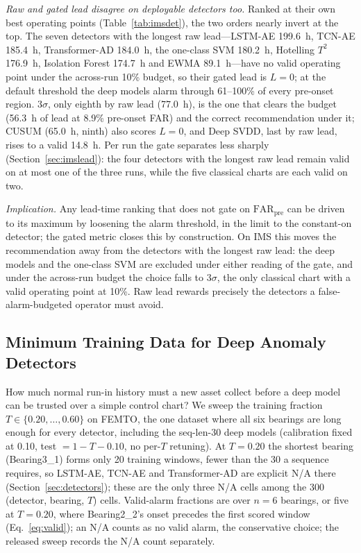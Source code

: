 \documentclass[IJPHM, 2026, 0]{PHMSociety}
\begin{document}
\emph{Raw and gated lead disagree on deployable detectors too.} Ranked at their own best operating points (Table~\ref{tab:imsdet}), the two orders nearly invert at the top. The seven detectors with the longest raw lead---LSTM-AE 199.6~h, TCN-AE 185.4~h, Transformer-AD 184.0~h, the one-class SVM 180.2~h, Hotelling $T^2$ 176.9~h, Isolation Forest 174.7~h and EWMA 89.1~h---have no valid operating point under the across-run 10\% budget, so their gated lead is $L=0$; at the default threshold the deep models alarm through 61--100\% of every pre-onset region. $3\sigma$, only eighth by raw lead (77.0~h), is the one that clears the budget (56.3~h of lead at 8.9\% pre-onset FAR) and the correct recommendation under it; CUSUM (65.0~h, ninth) also scores $L=0$, and Deep SVDD, last by raw lead, rises to a valid 14.8~h. Per run the gate separates less sharply (Section~\ref{sec:imslead}): the four detectors with the longest raw lead remain valid on at most one of the three runs, while the five classical charts are each valid on two.

\emph{Implication.} Any lead-time ranking that does not gate on $\text{FAR}_{\text{pre}}$ can be driven to its maximum by loosening the alarm threshold, in the limit to the constant-on detector; the gated metric closes this by construction. On IMS this moves the recommendation away from the detectors with the longest raw lead: the deep models and the one-class SVM are excluded under either reading of the gate, and under the across-run budget the choice falls to $3\sigma$, the only classical chart with a valid operating point at 10\%. Raw lead rewards precisely the detectors a false-alarm-budgeted operator must avoid.


\subsection{Minimum Training Data for Deep Anomaly Detectors}
\label{sec:mintrain}
How much normal run-in history must a new asset collect before a deep model can be trusted over a simple control chart? We sweep the training fraction $T \in \{0.20, \dots, 0.60\}$ on FEMTO, the one dataset where all six bearings are long enough for every detector, including the seq-len-30 deep models (calibration fixed at 0.10, test $= 1-T-0.10$, no per-$T$ retuning). At $T=0.20$ the shortest bearing (Bearing3\_1) forms only 20 training windows, fewer than the 30 a sequence requires, so LSTM-AE, TCN-AE and Transformer-AD are explicit N/A there (Section~\ref{sec:detectors}); these are the only three N/A cells among the 300 (detector, bearing, $T$) cells. Valid-alarm fractions are over $n=6$ bearings, or five at $T=0.20$, where Bearing2\_2's onset precedes the first scored window (Eq.~\ref{eq:valid}); an N/A counts as no valid alarm, the conservative choice; the released sweep records the N/A count separately.
\end{document}

